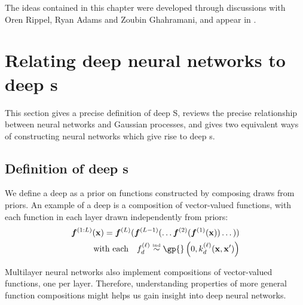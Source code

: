 The ideas contained in this chapter were developed through discussions with Oren Rippel, Ryan Adams and Zoubin Ghahramani, and appear in \citet{DuvRipAdaGha14}.




\section{Relating deep neural networks to deep \sgp{}s}
\label{sec:relating}

This section gives a precise definition of deep \gp{}S, reviews the precise relationship between neural networks and Gaussian processes, and gives two equivalent ways of constructing neural networks which give rise to deep \gp{}s.



\subsection{Definition of deep \sgp{}s}

We define a deep \gp{} as a prior on functions constructed by composing draws from \gp{} priors.
An example of a deep \gp{} is a composition of vector-valued functions, with each function in each layer drawn independently from \gp{} priors:
%
\begin{align}
\vf^{(1:L)}(\vx) = \vf^{(L)}(\vf^{(L-1)}(\dots \vf^{(2)}(\vf^{(1)}(\vx)) \dots)) \\
\textnormal{with each} \quad f_d^{(\layerindex)}  \simind \gp{} \left( 0, k^{(\layerindex)}_d(\vx, \vx') \right) \nonumber
\label{eq:deep-gp}
\end{align}
%

Multilayer neural networks also implement compositions of vector-valued functions, one per layer.
Therefore, understanding properties of more general function compositions might helps us gain insight into deep neural networks.


